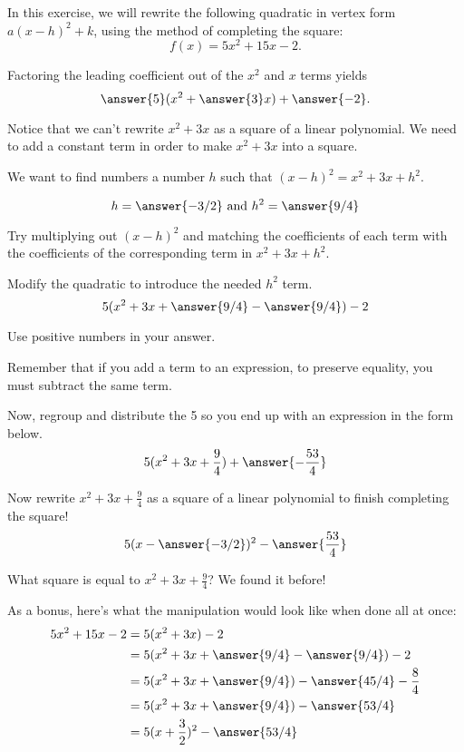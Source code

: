 \documentclass{ximera}
\author{Kenneth Berglund}
\begin{document}
In this exercise, we will rewrite the following quadratic in vertex form $a(x - h)^2 + k$, using the method of completing the square:
\[
f(x)=5x^2+15x-2.
\]
\begin{exercise}

Factoring the leading coefficient out of the $x^2$ and $x$ terms yields
$$
\answer{5}(x^2 + \answer{3}x) + \answer{-2}.
$$

\begin{exercise}
Notice that we can't rewrite $x^2 +3x$ as a square of a linear polynomial. We need to add a constant term in order to make $x^2 + 3x$ into a square. 

We want to find numbers a number $h$ such that $(x - h)^2 = x^2 + 3x + h^2$. 

$$
h = \answer{-3/2} \text{ and } h^2 = \answer{9/4}
$$
\begin{hint}
Try multiplying out $(x - h)^2$ and matching the coefficients of each term with the coefficients of the corresponding term in $x^2 + 3x + h^2$. 
\end{hint}


\begin{exercise}
Modify the quadratic to introduce the needed $h^2$ term.
$$
5(x^2 + 3x + \answer{9/4} - \answer{9/4}) - 2
$$ 

Use positive numbers in your answer.

\begin{hint}
Remember that if you add a term to an expression, to preserve equality, you must subtract the same term.
\end{hint}

\begin{exercise}
Now, regroup and distribute the 5 so you end up with an expression in the form below.
$$
5(x^2+3x+\frac{9}{4}) + \answer{-\frac{53}{4}}
$$ 

\begin{exercise}
Now rewrite $x^2 + 3x + \frac{9}{4}$ as a square of a linear polynomial to finish completing the square!
$$
5(x - \answer{-3/2})^2 - \answer{\frac{53}{4}}
$$ 
\begin{hint}
What square is equal to $x^2 + 3x + \frac{9}{4}$? We found it before!
\end{hint}

\begin{exercise}
As a bonus, here's what the manipulation would look like when done all at once:
\begin{align*}
5x^2 + 15x -2 & = 5(x^2 + 3x) -2 \\
& = 5(x^2 + 3x + \answer{9/4} - \answer{9/4}) - 2  \\
& = 5(x^2+3x+\answer{9/4})-\answer{45/4} - \frac{8}{4}\\
& = 5(x^2+3x+\answer{9/4})-\answer{53/4}\\
& = 5(x + \frac{3}{2})^2 - \answer{53/4}
\end{align*}
\end{exercise}
\end{exercise}
\end{exercise}
\end{exercise}
\end{exercise}
\end{exercise}
\end{document}
